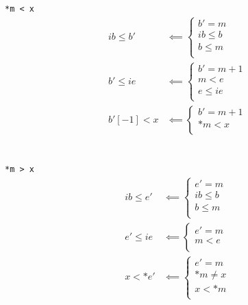 \begin{multicols}{2}
    \texttt{*m < x}
    \begin{align*}
        ib \leq b' & \impliedby
        \begin{cases}
            b' = m \\
            ib \leq b \\
            b \leq m \\
        \end{cases}
        \\
        b' \leq ie & \impliedby
        \begin{cases}
            b' = m + 1 \\
            m  < e \\
            e \leq ie \\
        \end{cases}
        \\
        b'[-1] < x & \impliedby
        \begin{cases}
            b' = m + 1 \\
            *m < x \\
        \end{cases}
    \end{align*}
    \\
    \columnbreak
    \\
    \texttt{*m > x}
    \begin{align*}
        ib \leq e' & \impliedby
        \begin{cases}
            e' = m \\
            ib \leq b \\
            b \leq m \\
        \end{cases}
        \\
        e' \leq ie & \impliedby
        \begin{cases}
            e' = m \\
            m < e \\
        \end{cases}
        \\
        x < *e' & \impliedby
        \begin{cases}
            e' = m \\
            *m \neq x \\
            x < *m \\
        \end{cases}
    \end{align*}
\end{multicols}


